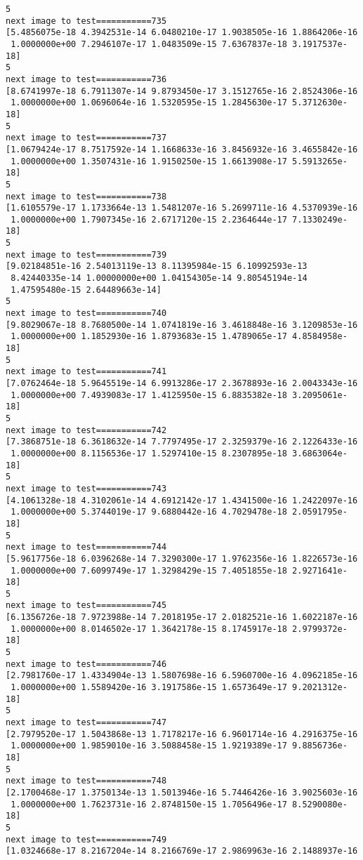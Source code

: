 \documentclass[11pt]{article}
\begin{document}
\begin{Verbatim}[commandchars=\\\{\}]
5
next image to test===========735
[5.4856075e-18 4.3942531e-14 6.0480210e-17 1.9038505e-16 1.8864206e-16
 1.0000000e+00 7.2946107e-17 1.0483509e-15 7.6367837e-18 3.1917537e-18]
5
next image to test===========736
[8.6741997e-18 6.7911307e-14 9.8793450e-17 3.1512765e-16 2.8524306e-16
 1.0000000e+00 1.0696064e-16 1.5320595e-15 1.2845630e-17 5.3712630e-18]
5
next image to test===========737
[1.0679424e-17 8.7517592e-14 1.1668633e-16 3.8456932e-16 3.4655842e-16
 1.0000000e+00 1.3507431e-16 1.9150250e-15 1.6613908e-17 5.5913265e-18]
5
next image to test===========738
[1.6105579e-17 1.1733664e-13 1.5481207e-16 5.2699711e-16 4.5370939e-16
 1.0000000e+00 1.7907345e-16 2.6717120e-15 2.2364644e-17 7.1330249e-18]
5
next image to test===========739
[9.02184851e-16 2.54013119e-13 8.11395984e-15 6.10992593e-13
 8.42440335e-14 1.00000000e+00 1.04154305e-14 9.80545194e-14
 1.47595480e-15 2.64489663e-14]
5
next image to test===========740
[9.8029067e-18 8.7680500e-14 1.0741819e-16 3.4618848e-16 3.1209853e-16
 1.0000000e+00 1.1852930e-16 1.8793683e-15 1.4789065e-17 4.8584958e-18]
5
next image to test===========741
[7.0762464e-18 5.9645519e-14 6.9913286e-17 2.3678893e-16 2.0043343e-16
 1.0000000e+00 7.4939083e-17 1.4125950e-15 6.8835382e-18 3.2095061e-18]
5
next image to test===========742
[7.3868751e-18 6.3618632e-14 7.7797495e-17 2.3259379e-16 2.1226433e-16
 1.0000000e+00 8.1156536e-17 1.5297410e-15 8.2307895e-18 3.6863064e-18]
5
next image to test===========743
[4.1061328e-18 4.3102061e-14 4.6912142e-17 1.4341500e-16 1.2422097e-16
 1.0000000e+00 5.3744019e-17 9.6880442e-16 4.7029478e-18 2.0591795e-18]
5
next image to test===========744
[5.9617756e-18 6.0396268e-14 7.3290300e-17 1.9762356e-16 1.8226573e-16
 1.0000000e+00 7.6099749e-17 1.3298429e-15 7.4051855e-18 2.9271641e-18]
5
next image to test===========745
[6.1356726e-18 7.9723988e-14 7.2018195e-17 2.0182521e-16 1.6022187e-16
 1.0000000e+00 8.0146502e-17 1.3642178e-15 8.1745917e-18 2.9799372e-18]
5
next image to test===========746
[2.7981760e-17 1.4334904e-13 1.5807698e-16 6.5960700e-16 4.0962185e-16
 1.0000000e+00 1.5589420e-16 3.1917586e-15 1.6573649e-17 9.2021312e-18]
5
next image to test===========747
[2.7979520e-17 1.5043868e-13 1.7178217e-16 6.9601714e-16 4.2916375e-16
 1.0000000e+00 1.9859010e-16 3.5088458e-15 1.9219389e-17 9.8856736e-18]
5
next image to test===========748
[2.1700468e-17 1.3750134e-13 1.5013946e-16 5.7446426e-16 3.9025603e-16
 1.0000000e+00 1.7623731e-16 2.8748150e-15 1.7056496e-17 8.5290080e-18]
5
next image to test===========749
[1.0324668e-17 8.2167204e-14 8.2166769e-17 2.9869963e-16 2.1488937e-16

\end{Verbatim}
\end{document}

